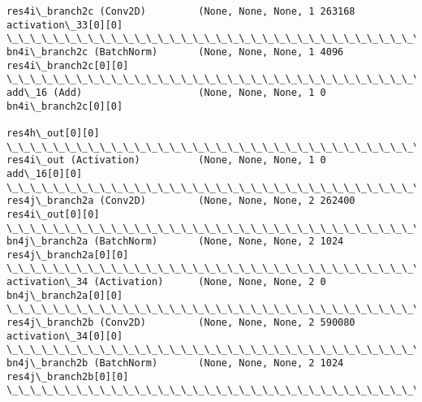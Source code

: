 \documentclass[11pt]{article}
\begin{document}
\begin{Verbatim}[commandchars=\\\{\}]
res4i\_branch2c (Conv2D)         (None, None, None, 1 263168      activation\_33[0][0]              
\_\_\_\_\_\_\_\_\_\_\_\_\_\_\_\_\_\_\_\_\_\_\_\_\_\_\_\_\_\_\_\_\_\_\_\_\_\_\_\_\_\_\_\_\_\_\_\_\_\_\_\_\_\_\_\_\_\_\_\_\_\_\_\_\_\_\_\_\_\_\_\_\_\_\_\_\_\_\_\_\_\_\_\_\_\_\_\_\_\_\_\_\_\_\_\_\_\_
bn4i\_branch2c (BatchNorm)       (None, None, None, 1 4096        res4i\_branch2c[0][0]             
\_\_\_\_\_\_\_\_\_\_\_\_\_\_\_\_\_\_\_\_\_\_\_\_\_\_\_\_\_\_\_\_\_\_\_\_\_\_\_\_\_\_\_\_\_\_\_\_\_\_\_\_\_\_\_\_\_\_\_\_\_\_\_\_\_\_\_\_\_\_\_\_\_\_\_\_\_\_\_\_\_\_\_\_\_\_\_\_\_\_\_\_\_\_\_\_\_\_
add\_16 (Add)                    (None, None, None, 1 0           bn4i\_branch2c[0][0]              
                                                                 res4h\_out[0][0]                  
\_\_\_\_\_\_\_\_\_\_\_\_\_\_\_\_\_\_\_\_\_\_\_\_\_\_\_\_\_\_\_\_\_\_\_\_\_\_\_\_\_\_\_\_\_\_\_\_\_\_\_\_\_\_\_\_\_\_\_\_\_\_\_\_\_\_\_\_\_\_\_\_\_\_\_\_\_\_\_\_\_\_\_\_\_\_\_\_\_\_\_\_\_\_\_\_\_\_
res4i\_out (Activation)          (None, None, None, 1 0           add\_16[0][0]                     
\_\_\_\_\_\_\_\_\_\_\_\_\_\_\_\_\_\_\_\_\_\_\_\_\_\_\_\_\_\_\_\_\_\_\_\_\_\_\_\_\_\_\_\_\_\_\_\_\_\_\_\_\_\_\_\_\_\_\_\_\_\_\_\_\_\_\_\_\_\_\_\_\_\_\_\_\_\_\_\_\_\_\_\_\_\_\_\_\_\_\_\_\_\_\_\_\_\_
res4j\_branch2a (Conv2D)         (None, None, None, 2 262400      res4i\_out[0][0]                  
\_\_\_\_\_\_\_\_\_\_\_\_\_\_\_\_\_\_\_\_\_\_\_\_\_\_\_\_\_\_\_\_\_\_\_\_\_\_\_\_\_\_\_\_\_\_\_\_\_\_\_\_\_\_\_\_\_\_\_\_\_\_\_\_\_\_\_\_\_\_\_\_\_\_\_\_\_\_\_\_\_\_\_\_\_\_\_\_\_\_\_\_\_\_\_\_\_\_
bn4j\_branch2a (BatchNorm)       (None, None, None, 2 1024        res4j\_branch2a[0][0]             
\_\_\_\_\_\_\_\_\_\_\_\_\_\_\_\_\_\_\_\_\_\_\_\_\_\_\_\_\_\_\_\_\_\_\_\_\_\_\_\_\_\_\_\_\_\_\_\_\_\_\_\_\_\_\_\_\_\_\_\_\_\_\_\_\_\_\_\_\_\_\_\_\_\_\_\_\_\_\_\_\_\_\_\_\_\_\_\_\_\_\_\_\_\_\_\_\_\_
activation\_34 (Activation)      (None, None, None, 2 0           bn4j\_branch2a[0][0]              
\_\_\_\_\_\_\_\_\_\_\_\_\_\_\_\_\_\_\_\_\_\_\_\_\_\_\_\_\_\_\_\_\_\_\_\_\_\_\_\_\_\_\_\_\_\_\_\_\_\_\_\_\_\_\_\_\_\_\_\_\_\_\_\_\_\_\_\_\_\_\_\_\_\_\_\_\_\_\_\_\_\_\_\_\_\_\_\_\_\_\_\_\_\_\_\_\_\_
res4j\_branch2b (Conv2D)         (None, None, None, 2 590080      activation\_34[0][0]              
\_\_\_\_\_\_\_\_\_\_\_\_\_\_\_\_\_\_\_\_\_\_\_\_\_\_\_\_\_\_\_\_\_\_\_\_\_\_\_\_\_\_\_\_\_\_\_\_\_\_\_\_\_\_\_\_\_\_\_\_\_\_\_\_\_\_\_\_\_\_\_\_\_\_\_\_\_\_\_\_\_\_\_\_\_\_\_\_\_\_\_\_\_\_\_\_\_\_
bn4j\_branch2b (BatchNorm)       (None, None, None, 2 1024        res4j\_branch2b[0][0]             
\_\_\_\_\_\_\_\_\_\_\_\_\_\_\_\_\_\_\_\_\_\_\_\_\_\_\_\_\_\_\_\_\_\_\_\_\_\_\_\_\_\_\_\_\_\_\_\_\_\_\_\_\_\_\_\_\_\_\_\_\_\_\_\_\_\_\_\_\_\_\_\_\_\_\_\_\_\_\_\_\_\_\_\_\_\_\_\_\_\_\_\_\_\_\_\_\_\_

\end{Verbatim}
\end{document}
